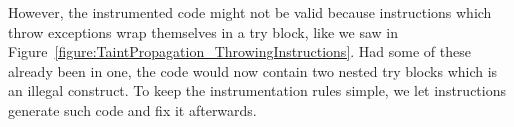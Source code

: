 \documentclass[12pt,twoside,notitlepage]{report}
\newcommand{\asm}[1] {\texttt{#1}}
\begin{document}
However, the instrumented code might not be valid because instructions which throw exceptions wrap themselves in a try block, like we saw in Figure~\ref{figure:TaintPropagation_ThrowingInstructions}. Had some of these already been in one, the code would now contain two nested try blocks which is an illegal construct. To keep the instrumentation rules simple, we let instructions generate such code and fix it afterwards.


\end{document}
